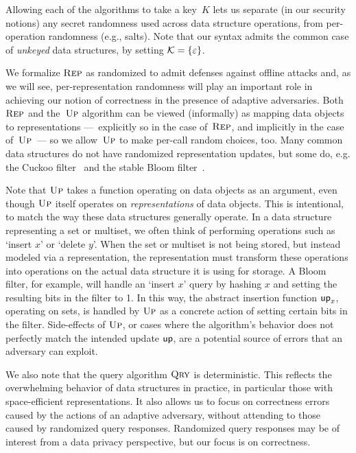Allowing each of the algorithms to take a key~$K$ lets us separate (in our
security notions) any secret randomness used across data structure operations,
from per-operation randomness (e.g., salts).  Note that our syntax admits the
common case of \emph{unkeyed} data structures, by setting
$\mathcal{K}=\{\varepsilon\}$.

We formalize $\textnormal{\textsc{Rep}}$ as randomized to admit defenses against offline attacks and,
as we will see, per-representation randomness will play an important role in
achieving our notion of correctness in the presence of adaptive adversaries.
Both~$\textnormal{\textsc{Rep}}$ and the~$\textnormal{\textsc{Up}}$ algorithm can be viewed (informally) as mapping data
objects to representations ---~explicitly so in the case of~$\textnormal{\textsc{Rep}}$, and
implicitly in the case of~$\textnormal{\textsc{Up}}$~--- so we allow~$\textnormal{\textsc{Up}}$ to make per-call random
choices, too.  Many common data structures do not have randomized representation
updates, but some do, e.g. the Cuckoo filter~\cite{fan2014cuckoo} and the stable
Bloom filter~\cite{deng2006approximately}.

Note that $\textnormal{\textsc{Up}}$ takes a function operating on data objects as an argument, even
though $\textnormal{\textsc{Up}}$ itself operates on \emph{representations} of data objects. This is
intentional, to match the way these data structures generally operate.
In a data structure representing a set or multiset, we often think of performing
operations such as `insert $x$' or `delete $y$'. When the set or multiset is not
being stored, but instead modeled via a representation, the representation must
transform these operations into operations on the actual data structure it is
using for storage.
A Bloom filter, for example, will handle an `insert $x$' query by hashing $x$
and setting the resulting bits in the filter to 1. In this way, the abstract
insertion function $\mathsf{up}_x$, operating on sets, is handled by $\textnormal{\textsc{Up}}$ as a concrete
action of setting certain bits in the filter. Side-effects of $\textnormal{\textsc{Up}}$,
or cases where the algorithm's behavior does not perfectly match the intended
update $\mathsf{up}$, are a potential source of errors that an adversary can exploit.

We also note that the query algorithm $\textnormal{\textsc{Qry}}$ is deterministic.  This reflects
the overwhelming behavior of data structures in practice, in particular those
with space-efficient representations. It also allows us to focus on correctness
errors caused by the actions of an adaptive adversary, without attending to
those caused by randomized query responses.  Randomized query responses may be
of interest from a data privacy perspective, but our focus is on correctness.